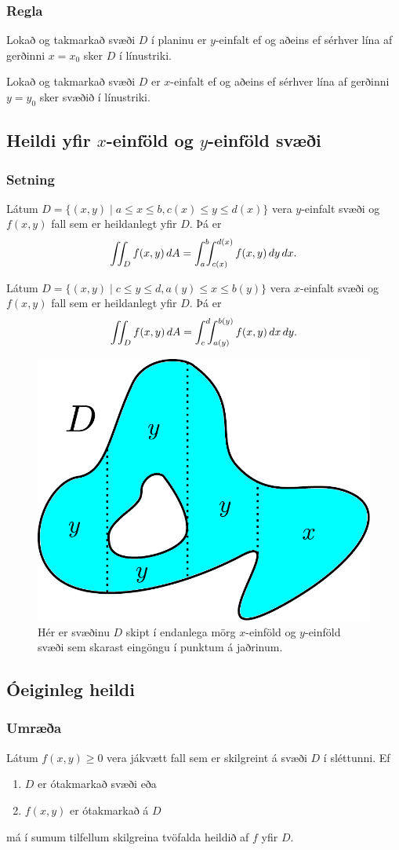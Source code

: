 \subsubsection{Regla }
Lokað og takmarkað svæði $D$ í planinu er $y$-einfalt ef og aðeins ef sérhver lína af gerðinni $x=x_0$ sker $D$ í línustriki.  

\medskip
Lokað og takmarkað svæði $D$ er $x$-einfalt ef og aðeins ef sérhver lína af gerðinni $y=y_0$ sker svæðið í línustriki.



\subsection{Heildi yfir $x$-einföld og $y$-einföld svæði} 

\subsubsection{Setning }
Látum 
$D=\{(x,y)\mid a\leq x\leq b, c(x)\leq y\leq d(x)\}$
vera $y$-einfalt svæði og $f(x,y)$ fall sem er heildanlegt yfir $D$.  Þá er 
$$\int\!\!\!\int_D f(x,y)\,dA=\int_a^b\!\!\!\int_{c(x)}^{d(x)}f(x,y)\,dy\, dx.$$


\medskip
Látum 
$D=\{(x,y)\mid c\leq y\leq d, a(y)\leq x\leq b(y)\}$
vera $x$-einfalt svæði og $f(x,y)$ fall sem er heildanlegt yfir $D$.  Þá er 
$$\int\!\!\!\int_D f(x,y)\,dA=\int_c^d\!\!\!\int_{a(y)}^{b(y)}f(x,y)\,dx\, dy.$$



 \begin {figure}[h!]
 \centering
            \includegraphics[width=0.35\linewidth]{einfalt2}
            \caption*{Hér er svæðinu $D$ skipt í endanlega mörg $x$-einföld og $y$-einföld svæði sem skarast eingöngu í punktum á jaðrinum.}
\end {figure}



\subsection{Óeiginleg heildi}
 \subsubsection{Umræða }
  Látum $f(x,y)\geq 0$ vera jákvætt fall sem er skilgreint á svæði $D$ í sléttunni. Ef
  \begin {enumerate}
   \item $D$ er ótakmarkað svæði eða
   \item $f(x,y)$ er ótakmarkað á $D$
  \end {enumerate}
má í sumum tilfellum skilgreina tvöfalda heildið af $f$ yfir $D$.


